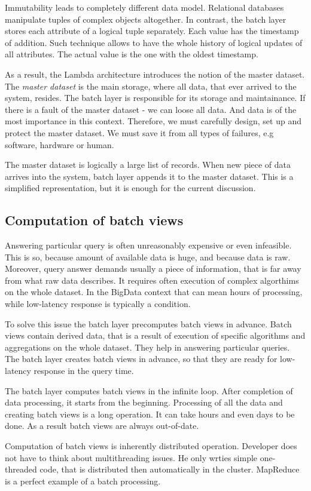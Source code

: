 Immutability leads to completely different data model.
Relational databases manipulate tuples of complex objects altogether.
In contrast, the batch layer stores each attribute of a logical tuple separately.
Each value has the timestamp of addition. 
Such technique allows to have the whole history of logical updates of all attributes.
The actual value is the one with the oldest timestamp.

As a result, the Lambda architecture introduces the notion of the master dataset.
The \textit{master dataset}  is the main storage, where all data, that ever arrived to the system, resides.
The batch layer is responsible for its storage and maintainance.
If there is a fault of the master dataset - we can loose all data.
And data is of the most importance in this context.
Therefore, we must carefully design, set up and protect the master dataset.
We must save it from all types of failures, e.g software, hardware or human.

The master dataset is logically a large list of records.
When new piece of data arrives into the system, batch layer appends it to the master dataset.
This is a simplified representation, but it is enough for the current discussion.

\subsection{Computation of batch views}

Answering particular query is often unreasonably expensive or even infeasible.
This is so, because amount of available data is huge, and because data is raw. 
Moreover, query answer demands usually a piece of information, that is far away from what raw data describes.
It requires often execution of complex algorthims on the whole dataset.
In the BigData context that can mean hours of processing, while low-latency response is typically a condition.

To solve this issue the batch layer precomputes batch views in advance.
Batch views contain derived data, that is a result of execution of specific algorithms and aggregations on the whole dataset.
They help in answering particular queries.
The batch layer creates batch views in advance, so that they are ready for low-latency response in the query time.

The batch layer computes batch views in the infinite loop.
After completion of data processing, it starts from the beginning.
Processing of all the data and creating batch views is a long operation.
It can take hours and even days to be done.
As a result batch views are always out-of-date.

Computation of batch views is inherently distributed operation.
Developer does not have to think about multithreading issues.
He only wrties simple one-threaded code, that is distributed then automatically in the cluster.
MapReduce is a perfect example of a batch processing.